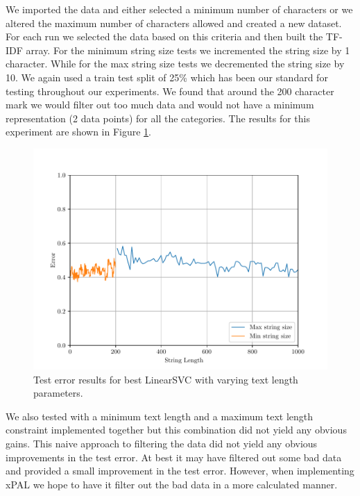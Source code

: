 We imported the data and either selected a minimum number of characters or we altered the maximum number of characters allowed and created a new dataset. For each run we selected the data based on this criteria and then built the TF-IDF array. For the minimum string size tests we incremented the string size by 1 character. While for the max string size tests we decremented the string size by 10. We again used a train test split of 25\% which has been our standard for testing throughout our experiments. We found that around the 200 character mark we would filter out too much data and would not have a minimum representation (2 data points) for all the categories. The results for this experiment are shown in Figure \ref{fig:grid_search_text_length}.

\begin{figure}[h]
    \centering
    \includegraphics[width=\scale\textwidth]{../img/plot_data_length_grid_search.pdf}
    \caption{Test error results for best LinearSVC with varying text length parameters.}
    \label{fig:grid_search_text_length}
  \end{figure}

We also tested with a minimum text length and a maximum text length constraint implemented together but this combination did not yield any obvious gains. This naive approach to filtering the data did not yield any obvious improvements in the test error. At best it may have filtered out some bad data and provided a small improvement in the test error. However, when implementing xPAL we hope to have it filter out the bad data in a more calculated manner.

